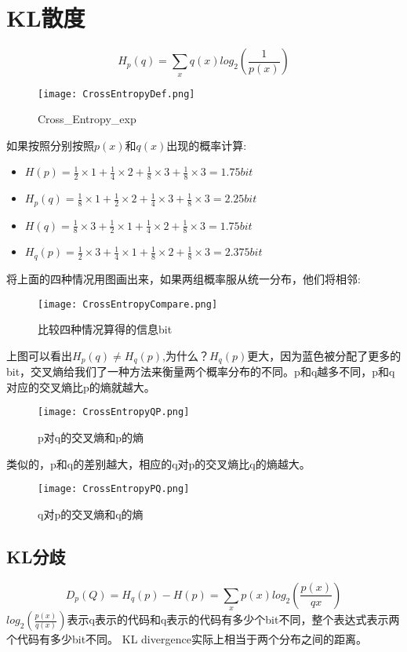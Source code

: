 \section{KL散度}
\begin{equation}
	H_p(q)=\sum_{x}q(x)log_2(\frac{1}{p(x)})
\end{equation}
\begin{figure}[H]
	\centering
	\texttt{[image: CrossEntropyDef.png]}
	\caption{Cross\_Entropy\_exp}
\end{figure}
如果按照分别按照$p(x)$和$q(x)$出现的概率计算:
\begin{itemize}
\item $H(p)=\frac{1}{2}\times 1+\frac{1}{4}\times 2+\frac{1}{8}\times 3+\frac{1}{8}\times 3=1.75bit$
\item $H_p(q)=\frac{1}{8}\times 1+\frac{1}{2}\times 2+\frac{1}{4}\times 3+\frac{1}{8}\times 3=2.25bit$
\item $H(q)=\frac{1}{8}\times 3+\frac{1}{2}\times 1+\frac{1}{4}\times 2+\frac{1}{8}\times 3= 1.75bit$
\item $H_q(p)=\frac{1}{2}\times 3+\frac{1}{4}\times 1+\frac{1}{8}\times 2+\frac{1}{8}\times 3 = 2.375bit$
\end{itemize}
将上面的四种情况用图画出来，如果两组概率服从统一分布，他们将相邻:
\begin{figure}[H]
	\centering
	\texttt{[image: CrossEntropyCompare.png]}
	\caption{比较四种情况算得的信息bit}
\end{figure}
上图可以看出$H_p(q)\neq H_q(p)$,为什么？$H_q(p)$更大，因为蓝色被分配了更多的bit，交叉熵给我们了一种方法来衡量两个概率分布的不同。p和q越多不同，p和q对应的交叉熵比p的熵就越大。
\begin{figure}[H]
	\centering
	\texttt{[image: CrossEntropyQP.png]}
	\caption{p对q的交叉熵和p的熵}
\end{figure}
类似的，p和q的差别越大，相应的q对p的交叉熵比q的熵越大。
\begin{figure}[H]
		\centering
			\texttt{[image: CrossEntropyPQ.png]}
				\caption{q对p的交叉熵和q的熵}
\end{figure}
\subsection{KL分歧}
\begin{equation}
	D_p(Q)=H_q(p)-H(p)=\sum_x p(x)log_2(\frac{p(x)}{q{x}})
\end{equation}
$log_2(\frac{p(x)}{q(x)})$表示q表示的代码和q表示的代码有多少个bit不同，整个表达式表示两个代码有多少bit不同。
KL divergence实际上相当于两个分布之间的距离。

